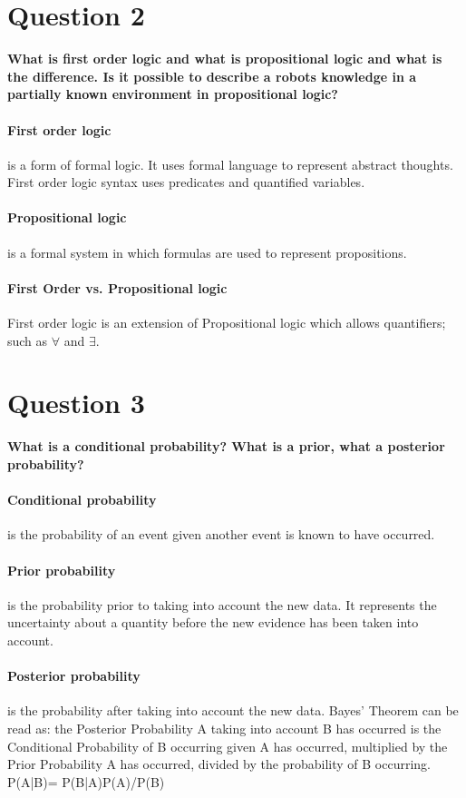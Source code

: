\documentclass[a4paper, 12 pt, conference, onecolumn]{IEEEconf}
\begin{document}
\setcounter{paragraph}{0}
\section{Question 2}
\textbf{What is first order logic and what is propositional logic and what is the difference. Is it possible to describe a robots knowledge in a partially known environment in propositional logic?}

\paragraph{First order logic} is a form of formal logic. It uses formal language to represent abstract thoughts. First order logic syntax uses predicates and quantified variables.
\paragraph{Propositional logic} is a formal system in which formulas are used to represent propositions.
\paragraph{First Order vs. Propositional logic} First order logic is an extension of Propositional logic which allows quantifiers; such as $\forall$  and $\exists$.

\section{Question 3}
\setcounter{paragraph}{0}
\textbf{What is a conditional probability? What is a prior, what a posterior probability?}
\paragraph{Conditional probability} is the probability of an event given another event is known to have occurred.
\paragraph{Prior probability} is the probability prior to taking into account the new data. It represents the uncertainty about a quantity before the new evidence has been taken into account.
\paragraph{Posterior probability} is the probability after taking into account the new data.
\newline
Bayes’ Theorem can be read as: the Posterior Probability A taking into account B has occurred is the Conditional Probability of B occurring given A has occurred, multiplied by the Prior Probability A has occurred, divided by the probability of B occurring.
P(A|B)= P(B|A)P(A)/P(B)

% 

% 
% 
%

\end{document}

